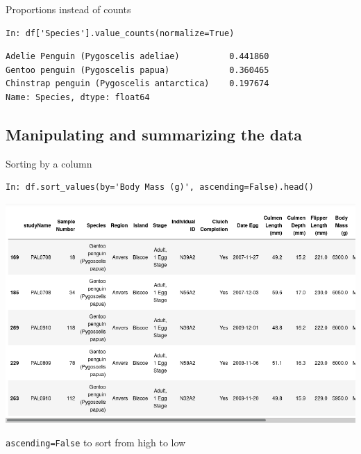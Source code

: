 \documentclass[aspectratio=169,usenames,dvipsnames]{beamer}
\begin{document}
\begin{frame}[fragile]{Proportions instead of counts}
\begin{lstlisting}
In: df['Species'].value_counts(normalize=True)
\end{lstlisting}\vspace{-1em}\begin{lstlisting}[style=plain]
Adelie Penguin (Pygoscelis adeliae)          0.441860
Gentoo penguin (Pygoscelis papua)            0.360465
Chinstrap penguin (Pygoscelis antarctica)    0.197674
Name: Species, dtype: float64
\end{lstlisting}
\end{frame}


\subsection{Manipulating and summarizing the data}
\frame{\tableofcontents[currentsubsection]}
\begin{frame}[fragile]{Sorting by a column}
\begin{lstlisting}
In: df.sort_values(by='Body Mass (g)', ascending=False).head()
\end{lstlisting}

\vspace{-0.5em}
\includegraphics[height=0.7\textheight]{fig/penguinsort}

\lstinline|ascending=False| to sort from high to low
\end{frame}
\end{document}
